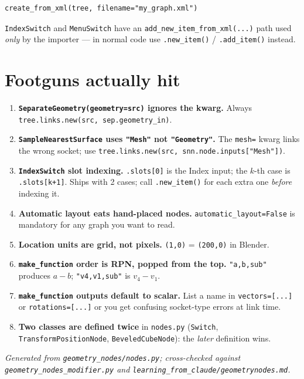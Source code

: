\documentclass[10pt,a4paper,twocolumn]{article}
\newcommand{\code}[1]{\texttt{\small #1}}
\begin{document}
\begin{lstlisting}
create_from_xml(tree, filename="my_graph.xml")
\end{lstlisting}

\code{IndexSwitch} and \code{MenuSwitch} have an
\code{add\_new\_item\_from\_xml(...)} path used \emph{only} by the
importer --- in normal code use \code{.new\_item()} / \code{.add\_item()}
instead.

\section{Footguns actually hit}
\label{sec:footguns}

\begin{enumerate}[leftmargin=14pt,itemsep=2pt]
\item \textbf{\code{SeparateGeometry(geometry=src)} ignores the kwarg.}
  Always \code{tree.links.new(src, sep.geometry\_in)}.
\item \textbf{\code{SampleNearestSurface} uses \code{"Mesh"} not
  \code{"Geometry"}.} The \code{mesh=} kwarg links the wrong socket; use
  \code{tree.links.new(src, snn.node.inputs["Mesh"])}.
\item \textbf{\code{IndexSwitch} slot indexing.} \code{.slots[0]} is the
  Index input; the $k$-th case is \code{.slots[k+1]}. Ships with 2 cases;
  call \code{.new\_item()} for each extra one \emph{before} indexing it.
\item \textbf{Automatic layout eats hand-placed nodes.}
  \code{automatic\_layout=False} is mandatory for any graph you want to
  read.
\item \textbf{Location units are grid, not pixels.} \code{(1,0)} =
  \code{(200,0)} in Blender.
\item \textbf{\code{make\_function} order is RPN, popped from the top.}
  \code{"a,b,sub"} produces $a-b$; \code{"v4,v1,sub"} is $v_4-v_1$.
\item \textbf{\code{make\_function} outputs default to scalar.} List a
  name in \code{vectors=[...]} or \code{rotations=[...]} or you get
  confusing socket-type errors at link time.
\item \textbf{Two classes are defined twice} in \code{nodes.py}
  (\code{Switch}, \code{TransformPositionNode}, \code{BeveledCubeNode}):
  the \emph{later} definition wins.
\end{enumerate}

\vfill
\begin{center}\small\itshape
Generated from \code{geometry\_nodes/nodes.py};
cross-checked against \code{geometry\_nodes\_modifier.py} and
\code{learning\_from\_claude/geometrynodes.md}.
\end{center}
\end{document}
